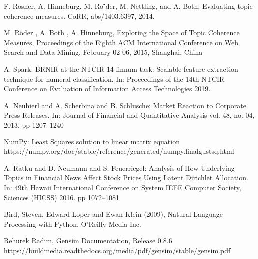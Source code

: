 \documentclass[12pt,journal,letterpaper,oneside,onecolumn]{IEEEtran}
\begin{document}
\begin{thebibliography}{1}
    F. Rosner, A. Hinneburg, M. Ro ̈der, M. Nettling, and A. Both. Evaluating topic coherence measures. CoRR,
    abs/1403.6397, 2014.
    
    M. Röder , A. Both , A. Hinneburg, Exploring the Space of Topic Coherence Measures, Proceedings of the Eighth ACM International Conference on Web Search and Data Mining, February 02-06, 2015, Shanghai, China
    
    A. Spark: BRNIR at the NTCIR-14 finnum task: Scalable feature extraction technique for numeral classification. In: Proceedings of the 14th NTCIR Conference on Evaluation of Information Access Technologies 2019.
    
    A. Neuhierl and A. Scherbina and B. Schlusche: Market Reaction to Corporate Press Releases. In: Journal of Financial and Quantitative Analysis vol. 48, no. 04, 2013. pp 1207–1240
    
    NumPy: Least Squares solution to linear matrix equation https://numpy.org/doc/stable/reference/generated/numpy.linalg.lstsq.html
    
    A. Ratku and D. Neumann and S. Feuerriegel: Analysis of How Underlying Topics in Financial News Affect Stock Prices Using Latent Dirichlet Allocation. In: 49th Hawaii International Conference on System IEEE Computer Society, Sciences (HICSS) 2016. pp 1072–1081
    
    Bird, Steven, Edward Loper and Ewan Klein (2009), Natural Language Processing with Python. O’Reilly Media Inc.
    
    Rehurek Radim, Gensim Documentation, Release 0.8.6 https://buildmedia.readthedocs.org/media/pdf/gensim/stable/gensim.pdf

\end{thebibliography}
\end{document}

